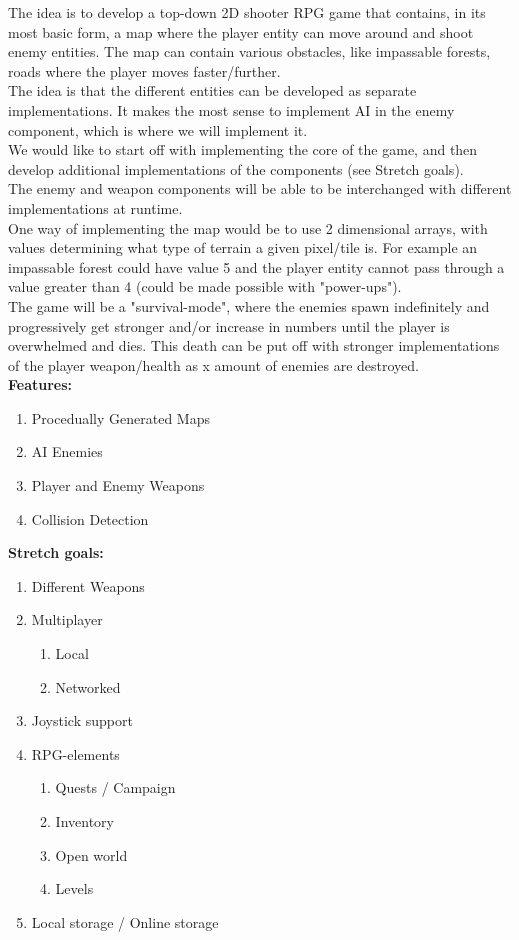 \documentclass[../main.tex]{subfiles}
\begin{document}
The idea is to develop a top-down 2D shooter RPG game that contains, in its most basic form, a map where the player entity can move around and shoot enemy entities. The map can contain various obstacles, like impassable forests, roads where the player moves faster/further. \\
The idea is that the different entities can be developed as separate implementations. It makes the most sense to implement AI in the enemy component, which is where we will implement it.\\
We would like to start off with implementing the core of the game, and then develop additional implementations of the components (see Stretch goals).\\
The enemy and weapon components will be able to be interchanged with different implementations at runtime.\\
One way of implementing the map would be to use 2 dimensional arrays, with values determining what type of terrain a given pixel/tile is. For example an impassable forest could have value 5 and the player entity cannot pass through a value greater than 4 (could be made possible with "power-ups").\\
The game will be a "survival-mode", where the enemies spawn indefinitely and progressively get stronger and/or increase in numbers until the player is overwhelmed and dies. This death can be put off with stronger implementations of the player weapon/health as x amount of enemies are destroyed.\\

\textbf{Features:}
\begin{enumerate}
	\item Procedually Generated Maps
	\item AI Enemies
	\item Player and Enemy Weapons
	\item Collision Detection
\end{enumerate}
\textbf{Stretch goals:}
\begin{enumerate}
	\item Different Weapons
	\item Multiplayer
		\begin{enumerate}
			\item Local
			\item Networked
		\end{enumerate}
	\item Joystick support
	\item RPG-elements
		\begin{enumerate}
			\item Quests / Campaign
			\item Inventory
			\item Open world
			\item Levels
		\end{enumerate}
	\item Local storage / Online storage
\end{enumerate}
\end{document}
